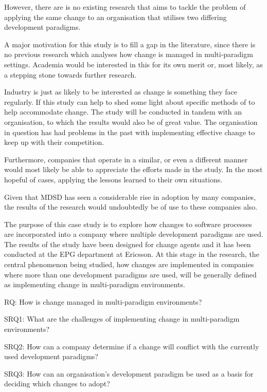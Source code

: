 \documentclass[10pt,twocolumn]{article}
\begin{document}
However, there are is no existing research that aims to tackle the problem of applying the same change to an organisation that utilises two differing development paradigms.

A major motivation for this study is to fill a gap in the literature, since there is no previous research which analyses how change is managed in multi-paradigm settings. Academia would be interested in this for its own merit or, most likely, as a stepping stone towards further research.

Industry is just as likely to be interested as change is something they face regularly. If this study can help to shed some light about specific methods of to help accommodate change. The study will be conducted in tandem with an organisation, to which the results would also be of great value. The organisation in question has had problems in the past with implementing effective change to keep up with their competition. 

Furthermore, companies that operate in a similar, or even a different manner would most likely be able to appreciate the efforts made in the study. In the most hopeful of cases, applying the lessons learned to their own situations.

Given that MDSD has seen a considerable rise in adoption by many companies\cite{millermda}, the results of the research would undoubtedly be of use to these companies also.

The purpose of this case study is to explore how changes to software processes are incorporated into a company where multiple development paradigms are used. The results of the study have been designed for change agents and it has been conducted at the EPG department at Ericsson. At this stage in the research, the central phenomenon being studied, how changes are implemented in companies where more than one development paradigms are used, will be generally defined as implementing change in multi-paradigm environments. 


RQ: How is change managed in multi-paradigm environments?

SRQ1: What are the challenges of implementing change in multi-paradigm environments?

SRQ2: How can a company determine if a change will conflict with the currently used development paradigms?

SRQ3: How can an organisation's development paradigm be used as a basis for deciding which changes to adopt?
\end{document}
